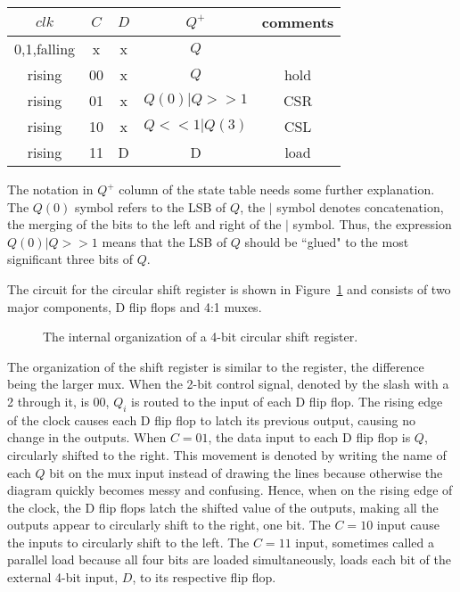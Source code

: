 \begin{tabular}{c|c|c||c||c}

$clk$          & $C$  & $D$  & $Q^+$     & comments 	\\ \hline 
0,1,falling  & x  & x  & $Q$       &		\\ \hline
rising       & 00 & x  & $Q$       & hold	\\ \hline
rising       & 01 & x  & $Q(0)|Q>>1$ & CSR	\\ \hline
rising       & 10 & x  & $Q<<1|Q(3)$ & CSL	\\ \hline
rising       & 11 & D  & D         & load	\\ 

\end{tabular}

The notation in $Q^+$ column of the state table needs some further
explanation.  The $Q(0)$ symbol refers to the LSB of $Q$, the $|$ symbol 
denotes concatenation, the merging of the bits to the left and right
of the $|$  symbol.  Thus, the expression $Q(0) | Q>>1$ means that the 
LSB of $Q$ should be ``glued" to the most significant three bits of
$Q$.

The circuit for the circular shift register is shown in 
Figure~\ref{fig:sequentialBBShiftReg} and consists of two major components, D flip 
flops and 4:1 muxes.  

\begin{figure}[ht]
\caption{The internal organization of a 4-bit circular shift register.}
\label{fig:sequentialBBShiftReg}

\end{figure}

The organization of the shift register is similar to the register, the 
difference being the larger mux.  When the 2-bit control signal,
denoted by the slash with a 2 through it, is 00, $Q_i$ is routed to
the input of each D flip flop.  The rising edge of the clock 
causes each D flip flop to latch its previous output, causing no 
change in the outputs.  When $C=01$, the data input to each D flip 
flop is $Q$, circularly shifted to the right.  This movement is denoted by
writing the name of each $Q$ bit on the mux input instead of drawing
the lines because otherwise the diagram quickly becomes messy and confusing.
Hence, when on the rising edge of the clock, the D flip flops 
latch the shifted value of the outputs, making all the outputs 
appear to circularly shift to the right, one bit.  The $C=10$ input
cause the inputs to circularly shift to the left.  The $C=11$ input,
sometimes called a parallel load because all four bits are loaded
simultaneously, loads each bit of the external 4-bit input, $D$, to its
respective flip flop.

